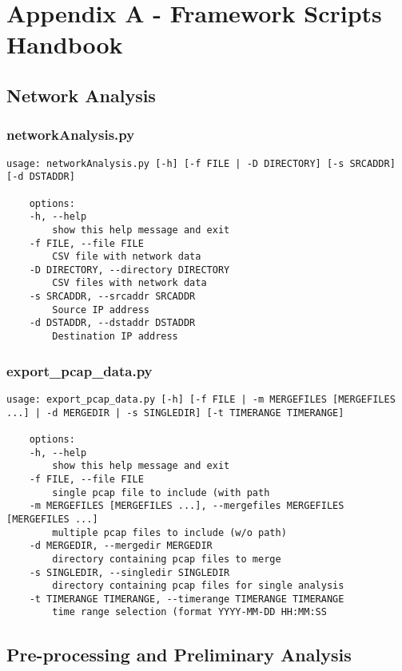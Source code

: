 \chapter*{Appendix A - Framework Scripts Handbook}

\section*{Network Analysis}
\subsection*{networkAnalysis.py}
\begin{lstlisting}[numbers=none]
	usage: networkAnalysis.py [-h] [-f FILE | -D DIRECTORY] [-s SRCADDR] [-d DSTADDR]
	
	options:
	-h, --help            
		show this help message and exit
	-f FILE, --file FILE  
		CSV file with network data
	-D DIRECTORY, --directory DIRECTORY
		CSV files with network data
	-s SRCADDR, --srcaddr SRCADDR
		Source IP address
	-d DSTADDR, --dstaddr DSTADDR
		Destination IP address
\end{lstlisting}

\subsection*{export\_pcap\_data.py}
\begin{lstlisting}[numbers=none]
	usage: export_pcap_data.py [-h] [-f FILE | -m MERGEFILES [MERGEFILES ...] | -d MERGEDIR | -s SINGLEDIR] [-t TIMERANGE TIMERANGE]
	
	options:
	-h, --help            
		show this help message and exit
	-f FILE, --file FILE  
		single pcap file to include (with path
	-m MERGEFILES [MERGEFILES ...], --mergefiles MERGEFILES [MERGEFILES ...]
		multiple pcap files to include (w/o path)
	-d MERGEDIR, --mergedir MERGEDIR
		directory containing pcap files to merge
	-s SINGLEDIR, --singledir SINGLEDIR
		directory containing pcap files for single analysis
	-t TIMERANGE TIMERANGE, --timerange TIMERANGE TIMERANGE
		time range selection (format YYYY-MM-DD HH:MM:SS
\end{lstlisting}

\section*{Pre-processing and Preliminary Analysis}
